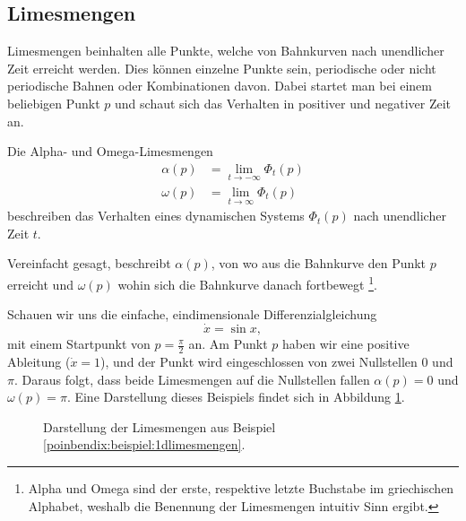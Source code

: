 \subsection{Limesmengen} \label{poinbendix:subsection:limesmengen}

Limesmengen beinhalten alle Punkte, welche von Bahnkurven nach unendlicher Zeit erreicht werden.
Dies können einzelne Punkte sein, periodische oder nicht periodische Bahnen oder Kombinationen davon.
Dabei startet man bei einem beliebigen Punkt $p$ und schaut sich das Verhalten in positiver und negativer Zeit an.

\begin{definition}[Limesmengen]
Die Alpha- und Omega-Limesmengen
\label{poinbendix:def:limesmengen}
\begin{align*}
    \alpha(p) &= \lim_{t\to-\infty} \Phi_t(p) \\
    \omega(p) &= \lim_{t\to\infty} \Phi_t(p)
\end{align*}
beschreiben das Verhalten eines dynamischen Systems $\Phi_t(p)$ nach unendlicher Zeit $t$.
\end{definition}

Vereinfacht gesagt, beschreibt $\alpha(p)$, von wo aus die Bahnkurve den Punkt $p$ erreicht und $\omega(p)$ wohin sich die Bahnkurve danach fortbewegt
\footnote{Alpha und Omega sind der erste, respektive letzte Buchstabe im griechischen Alphabet, weshalb die Benennung der Limesmengen intuitiv Sinn ergibt.}.

\begin{beispiel} \label{poinbendix:beispiel:1dlimesmengen}
Schauen wir uns die einfache, eindimensionale Differenzialgleichung
\begin{equation*}
    \dot{x} = \sin x,
\end{equation*}
mit einem Startpunkt von $p = \frac{\pi}{2}$ an.
Am Punkt $p$ haben wir eine positive Ableitung ($\dot{x} = 1$), und der Punkt wird eingeschlossen von zwei Nullstellen $0$ und $\pi$.
Daraus folgt, dass beide Limesmengen auf die Nullstellen fallen $\alpha(p) = 0$ und $\omega(p) = \pi$.
Eine Darstellung dieses Beispiels findet sich in Abbildung \ref{poinbendix:fig:limesmenge}.
\begin{figure}
    \centering
    
    \caption{Darstellung der Limesmengen aus Beispiel \ref{poinbendix:beispiel:1dlimesmengen}.}
    \label{poinbendix:fig:limesmenge}
\end{figure}
\end{beispiel}
